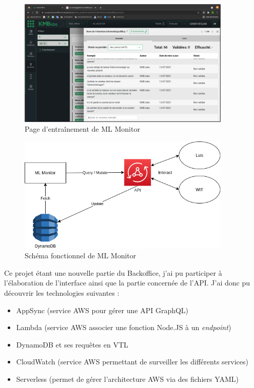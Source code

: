 \documentclass[12pt,a4paper,oneside]{scrreprt}
\begin{document}
\begin{figure}
	\centering
	\includegraphics[width=0.9\textwidth]{pictures/mlmonitor_training.png}
	\caption{Page d'entraînement de ML Monitor}
	\label{fig:mlmonitor_training}
\end{figure}

\begin{figure}[!ht]
	\includegraphics[width=0.9\textwidth]{pictures/diagram_mlmonitor.png}
	\caption{Schéma fonctionnel de ML Monitor}
\end{figure}

\begin{info}
	Ce projet étant une nouvelle partie du Backoffice, j'ai pu participer à l'élaboration de l'interface ainsi que la partie concernée de l'API. J'ai donc pu découvrir les technologies suivantes :
	\begin{itemize}
		\item AppSync (service AWS pour gérer une API GraphQL)
		\item Lambda (service AWS associer une fonction Node.JS à un \textit{endpoint})
		\item DynamoDB et ses requêtes en VTL
		\item CloudWatch (service AWS permettant de surveiller les différents services)
		\item Serverless (permet de gérer l'architecture AWS via des fichiers YAML)
	\end{itemize}
\end{info}
\end{document}
